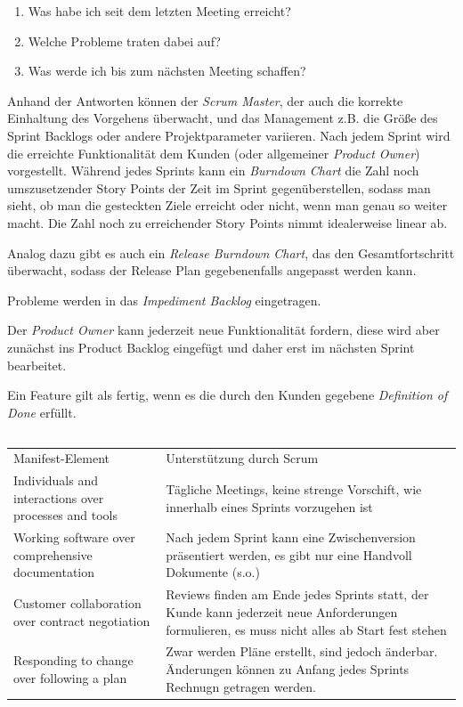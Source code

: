 \documentclass{scrartcl}
\begin{document}
\begin{enumerate}
   \item Was habe ich seit dem letzten Meeting erreicht?
   \item Welche Probleme traten dabei auf?
   \item Was werde ich bis zum nächsten Meeting schaffen?
\end{enumerate}

Anhand der Antworten können der \emph{Scrum Master}, der auch die korrekte
Einhaltung des Vorgehens überwacht, und das Management z.B. die Größe des Sprint
Backlogs oder andere Projektparameter variieren. Nach jedem Sprint wird die
erreichte Funktionalität dem Kunden (oder allgemeiner \emph{Product Owner})
vorgestellt. Während jedes Sprints kann ein \emph{Burndown Chart} die Zahl noch
umszusetzender Story Points der Zeit im Sprint gegenüberstellen, sodass man
sieht, ob man die gesteckten Ziele erreicht oder nicht, wenn man genau so weiter
macht. Die Zahl noch zu erreichender Story Points nimmt idealerweise linear ab.

Analog dazu gibt es auch ein \emph{Release Burndown Chart}, das den
Gesamtfortschritt überwacht, sodass der Release Plan gegebenenfalls angepasst
werden kann.   

Probleme werden in das \emph{Impediment Backlog} eingetragen.

Der \emph{Product Owner} kann jederzeit neue Funktionalität fordern, diese wird
aber zunächst ins Product Backlog eingefügt und daher erst im nächsten Sprint
bearbeitet.

Ein Feature gilt als fertig, wenn es die durch den Kunden gegebene
\emph{Definition of Done} erfüllt.

\subsection{}

\begin{center}
   \begin{tabular}{p{}p{}}
      Manifest-Element & Unterstützung durch Scrum \\
      Individuals and interactions over processes and tools & Tägliche Meetings,
      keine strenge Vorschift, wie innerhalb eines Sprints vorzugehen ist \\
      Working software over comprehensive documentation & Nach jedem Sprint kann
      eine Zwischenversion präsentiert werden, es gibt nur eine Handvoll
      Dokumente (s.o.) \\
      Customer collaboration over contract negotiation & Reviews finden am Ende
      jedes Sprints statt, der Kunde kann jederzeit neue Anforderungen
      formulieren, es muss nicht alles ab Start fest stehen \\
      Responding to change over following a plan & Zwar werden Pläne erstellt,
      sind jedoch änderbar. Änderungen können zu Anfang jedes Sprints Rechnugn
      getragen werden.
   \end{tabular}
\end{center}
\end{document}
